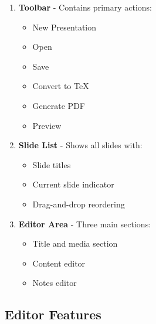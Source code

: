 \documentclass[11pt,a4paper]{article}
\begin{document}
\begin{enumerate}
    \item \textbf{Toolbar} - Contains primary actions:
        \begin{itemize}
            \item New Presentation
            \item Open
            \item Save
            \item Convert to TeX
            \item Generate PDF
            \item Preview
        \end{itemize}

    \item \textbf{Slide List} - Shows all slides with:
        \begin{itemize}
            \item Slide titles
            \item Current slide indicator
            \item Drag-and-drop reordering
        \end{itemize}

    \item \textbf{Editor Area} - Three main sections:
        \begin{itemize}
            \item Title and media section
            \item Content editor
            \item Notes editor
        \end{itemize}
\end{enumerate}

\subsection{Editor Features}
\end{document}
